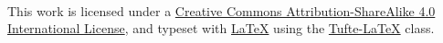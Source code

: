 \documentclass[a4paper,twoside,notoc,marginals=justified,nobib]{tufte-book}
\newcommand{\monthyear}{\ifcase\month\or January\or February\or March\or 
April\or May\or June\or July\or August\or September\or October\or 
November\or December\fi\space\number\year} %
\begin{document}

\newpage
~\vfill
\thispagestyle{empty}
\setlength{\parindent}{0pt}
\setlength{\parskip}{\baselineskip}

\ccbysa

This work is licensed under a 
\href{http://creativecommons.org/licenses/by-sa/4.0/} {Creative Commons 
	Attribution-ShareAlike 4.0 International License}, and typeset with 
\href{ttps://www.latex-project.org/}{\LaTeX} using the 
\href{https://tufte-latex.github.io/tufte-latex/}{Tufte-LaTeX} class.



\renewcommand{\baselinestretch}{0.75}\normalsize
\tableofcontents %
\renewcommand{\baselinestretch}{1.0}\normalsize

\end{document}
